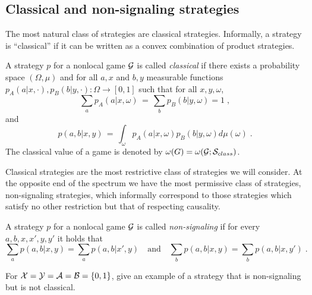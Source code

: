 \subsection{Classical and non-signaling strategies}

The most natural class of strategies are classical strategies. Informally, a strategy is ``classical'' if it can be written as a convex combination of product strategies. 

\begin{definition}
A strategy $p$ for a nonlocal game $\mathcal{G}$ is called \emph{classical} if there exists a probability space $(\Omega,\mu)$ and for all $a,x$ and $b,y$ measurable functions $p_A(a|x,\cdot),p_B(b|y,\cdot):\Omega\to [0,1]$ such that for all $x,y,\omega$, 
\[\sum_a p_A(a|x,\omega)\,=\,\sum_b p_B(b|y,\omega)=1\;,\]
 and 
\[p(a,b|x,y)\,=\,\int_\omega p_A(a|x,\omega)p_B(b|y,\omega)d\mu(\omega)\;.\] 
The classical value of a game is denoted by $\omega(G) = \omega(\mathcal{G};\mathcal{S}_{class})$. 
\end{definition}

Classical strategies are the most restrictive class of strategies we will consider. At the opposite end of the spectrum we have the most permissive class of strategies, non-signaling strategies, which informally correspond to those strategies which satisfy no other restriction but that of respecting causality. 

\begin{definition}
A strategy $p$ for a nonlocal game $\mathcal{G}$ is called \emph{non-signaling} if for every $a,b,x,x',y,y'$ it holds that 
\[ \sum_{a} p(a,b|x,y) = \sum_{a} p(a,b|x',y) \quad\text{and}\quad \sum_{b} p(a,b|x,y) = \sum_{b} p(a,b|x,y')\;.\]
\end{definition}

\begin{exercise}
For $\mathcal{X}=\mathcal{Y}=\mathcal{A}=\mathcal{B}=\{0,1\}$, give an example of a strategy that is non-signaling but is not classical. 
\end{exercise}

